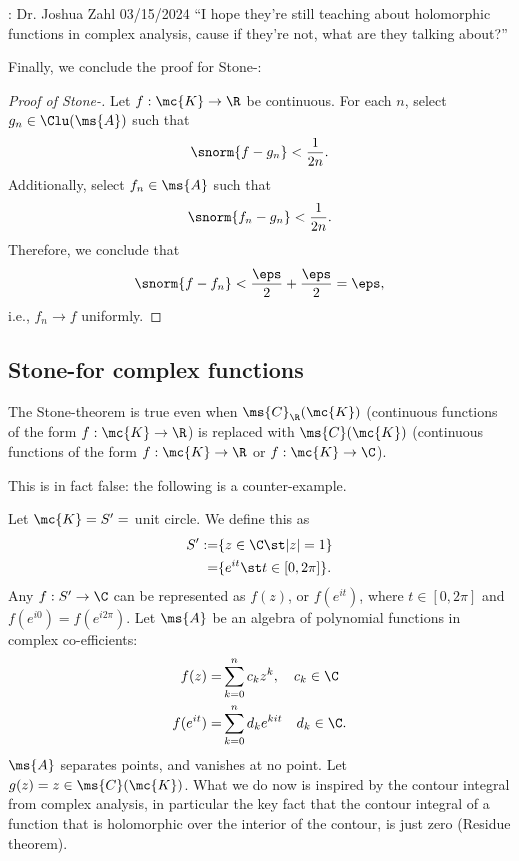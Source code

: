 \begin{nquote}{: Dr. Joshua Zahl 03/15/2024}
    ``I hope they're still teaching about holomorphic functions in complex analysis, cause if they're not, what are they talking about?''
\end{nquote}
Finally, we conclude the proof for Stone-\Weierstass:
\begin{proof}[Proof of Stone-\Weierstass]
    Let \(f:\mc{K}\to\R\) be continuous. For each \(n\), select \(g_n\in\Clu(\ms{A})\) such that 
    \begin{equation*} 
        \snorm{f-g_n}<\frac{1}{2n}.
    \end{equation*}
    Additionally, select \(f_n\in\ms{A}\) such that 
    \begin{equation*} 
        \snorm{f_n-g_n}<\frac{1}{2n}.
    \end{equation*}
    Therefore, we conclude that 
    \begin{equation*} 
        \snorm{f-f_n}<\frac{\eps}{2}+\frac{\eps}{2}=\eps,
    \end{equation*}
    i.e., \(f_n\to f\) uniformly.
\end{proof}

\subsection{Stone-\Weierstass for complex functions}
\begin{conjecture}
    The Stone-\Weierstass theorem is true even when \(\ms{C}_{\R}(\mc{K})\) (continuous functions of the form \(f:\mc{K}\to\R\)) is replaced with \(\ms{C}(\mc{K})\) (continuous functions of the form \(f:\mc{K}\to\R\) or \(f:\mc{K}\to\C\)).
\end{conjecture}
This is in fact false: the following is a counter-example.

\medskip

Let \(\mc{K}=S'=\) unit circle. We define this as 
\begin{align*} 
    S':=&\{z\in\C\st |z|=1\}\\
       =&\{e^{it}\st t\in [0,2\pi]\}.
\end{align*}
Any \(f:S'\to\C\) can be represented as \(f(z)\), or \(f(e^{it})\), where \(t\in[0,2\pi]\) and \(f(e^{i0})=f(e^{i2\pi})\). Let \(\ms{A}\) be an algebra of polynomial functions in complex co-efficients:
\begin{align*} 
    f(z)=&\sum_{k=0}^n c_kz^k,\quad c_k\in\C\\
    f(e^{it})=&\sum_{k=0}^n d_ke^{kit}\quad d_k\in\C.
\end{align*}
\(\ms{A}\) separates points, and vanishes at no point. Let \(g(z)=z\in\ms{C}(\mc{K})\). What we do now is inspired by the contour integral from complex analysis, in particular the key fact that the contour integral of a function that is holomorphic over the interior of the contour, is just zero (Residue theorem). 


